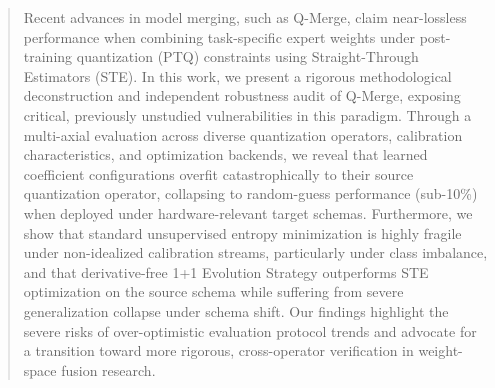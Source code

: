 \begin{abstract}
Recent advances in model merging, such as Q-Merge, claim near-lossless performance when combining task-specific expert weights under post-training quantization (PTQ) constraints using Straight-Through Estimators (STE). In this work, we present a rigorous methodological deconstruction and independent robustness audit of Q-Merge, exposing critical, previously unstudied vulnerabilities in this paradigm. Through a multi-axial evaluation across diverse quantization operators, calibration characteristics, and optimization backends, we reveal that learned coefficient configurations overfit catastrophically to their source quantization operator, collapsing to random-guess performance (sub-10\%) when deployed under hardware-relevant target schemas. Furthermore, we show that standard unsupervised entropy minimization is highly fragile under non-idealized calibration streams, particularly under class imbalance, and that derivative-free 1+1 Evolution Strategy outperforms STE optimization on the source schema while suffering from severe generalization collapse under schema shift. Our findings highlight the severe risks of over-optimistic evaluation protocol trends and advocate for a transition toward more rigorous, cross-operator verification in weight-space fusion research.
\end{abstract}
